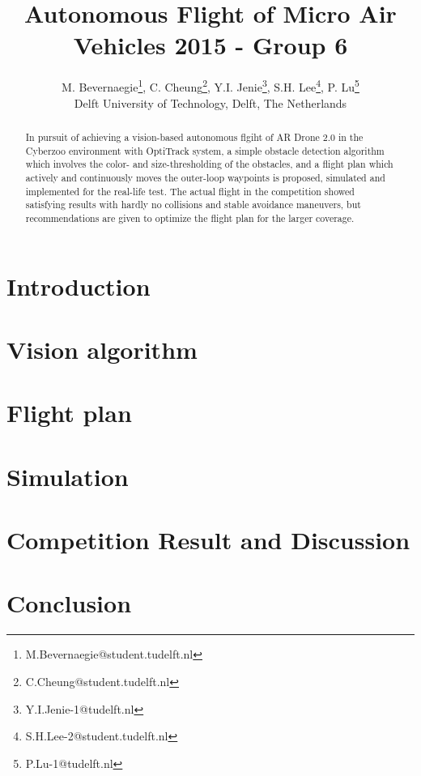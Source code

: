\documentclass{article}
\title{Autonomous Flight of Micro Air Vehicles 2015 - Group 6}
\author{M. Bevernaegie\thanks{M.Bevernaegie@student.tudelft.nl}, C. Cheung\thanks{C.Cheung@student.tudelft.nl}, Y.I. Jenie\thanks{Y.I.Jenie-1@tudelft.nl}, S.H. Lee\thanks{S.H.Lee-2@student.tudelft.nl}, P. Lu\thanks{P.Lu-1@tudelft.nl} \\ Delft University of Technology, Delft, The Netherlands}
\begin{document}
\maketitle

\begin{abstract}
In pursuit of achieving a vision-based autonomous flgiht of AR Drone 2.0 in the Cyberzoo environment with OptiTrack system, a simple obstacle detection algorithm which involves the color- and size-thresholding of the obstacles, and a flight plan which actively and continuously moves the outer-loop waypoints is proposed, simulated and implemented for the real-life test. The actual flight in the competition showed satisfying results with hardly no collisions and stable avoidance maneuvers, but recommendations are given to optimize the flight plan for the larger coverage.
\end{abstract}

\section{Introduction} \label{section:introduction}



\section{Vision algorithm}



\section{Flight plan}

%
%

\section{Simulation}
\label{section:simulation}



\section{Competition Result and Discussion}

\section{Conclusion}





\appendix
\newcommand{\appsection}[1]{\let\oldthesection\thesection
  \renewcommand{\thesection}{Appendix \oldthesection:}
  \section{#1}\let\thesection\oldthesection}

\end{document}
